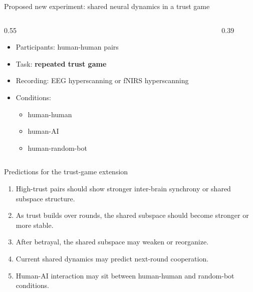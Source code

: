 \documentclass[aspectratio=169,11pt]{beamer}
\begin{document}
\begin{frame}{Proposed new experiment: shared neural dynamics in a trust game}
\begin{columns}[T]
  \begin{column}{0.55\textwidth}
    \begin{itemize}
      \item Participants: human-human pairs
      \item Task: \textbf{repeated trust game}
      \item Recording: EEG hyperscanning or fNIRS hyperscanning
      \item Conditions:
      \begin{itemize}
        \item human-human
        \item human-AI
        \item human-random-bot
      \end{itemize}
    \end{itemize}
  \end{column}
  \begin{column}{0.39\textwidth}
    \begin{center}
    \end{center}
  \end{column}
\end{columns}
\end{frame}

\begin{frame}{Predictions for the trust-game extension}
\begin{enumerate}
  \item High-trust pairs should show stronger inter-brain synchrony or shared subspace structure.
  \item As trust builds over rounds, the shared subspace should become stronger or more stable.
  \item After betrayal, the shared subspace may weaken or reorganize.
  \item Current shared dynamics may predict next-round cooperation.
  \item Human-AI interaction may sit between human-human and random-bot conditions.
\end{enumerate}
\end{frame}
\end{document}

